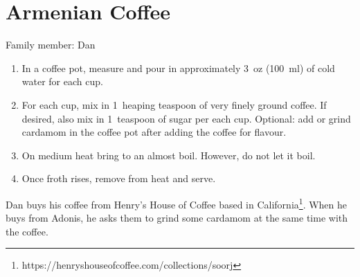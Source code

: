 \chapter{Armenian Coffee}
\label{ch:armeniancoffee}



Family member: Dan

\begin{enumerate}
    \item In a coffee pot, measure and pour in approximately 3~oz (100~ml) of cold water for each cup.
    \item For each cup, mix in 1~heaping teaspoon of very finely ground coffee. If desired, also mix in 1~teaspoon of sugar per each cup. Optional: add or grind cardamom in the coffee pot after adding the coffee for flavour.
    \item On medium heat bring to an almost boil. However, do not let it boil.
    \item Once froth rises, remove from heat and serve.
\end{enumerate}

Dan buys his coffee from Henry's House of Coffee based in California\footnote{https://henryshouseofcoffee.com/collections/soorj}. When he buys from Adonis, he asks them to grind some cardamom at the same time with the coffee.
